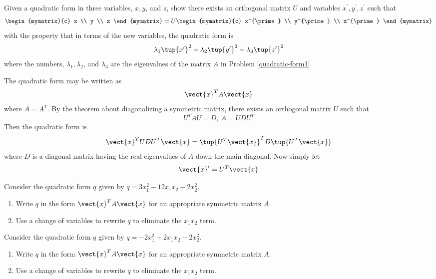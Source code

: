 \begin{enumialphparenastyle}
\begin{ex} Given a quadratic form in three variables, $x,y$, and $z$, show there
exists an orthogonal matrix $U$ and variables $x^{\prime },y^{\prime
},z^{\prime }$ such that 
\begin{equation*}
\begin{mymatrix}{c}
x \\ 
y \\ 
z
\end{mymatrix} =U\begin{mymatrix}{c}
x^{\prime } \\ 
y^{\prime } \\ 
z^{\prime }
\end{mymatrix}
\end{equation*}
with the property that in terms of the new variables, the quadratic form is 
\begin{equation*}
\lambda _{1}\tup{x^{\prime }} ^{2}+\lambda _{2}\tup{y^{\prime
}} ^{2}+\lambda _{3}\tup{z^{\prime }} ^{2}
\end{equation*}
where the numbers, $\lambda _{1},\lambda _{2}$, and $\lambda _{3}$ are the
eigenvalues of the matrix $A$ in Problem \ref{quadratic-form1}. 
\begin{sol}
The quadratic form
may be written as
\[
\vect{x}^{T}A\vect{x}
\]
where $A=A^{T}$. By the theorem about diagonalizing a symmetric matrix,
there exists an orthogonal matrix $U$ such that
\[
U^{T}AU=D,\ A=UDU^{T}
\]
Then the quadratic form is
\[
\vect{x}^{T}UDU^{T}\vect{x}=\tup{U^{T}\vect{x}} ^{T}D\tup{
U^{T}\vect{x}}
\]
where $D$ is a diagonal matrix having the real eigenvalues of $A$ down the
main diagonal. Now simply let
\[
\vect{x}^{\prime } =  U^{T}\vect{x}
\]
\end{sol}
\end{ex}

\begin{ex} Consider the quadratic form $q$ given by $q = 3x_1^2 -12x_1x_2 - 2x_2^2$.\begin{enumerate}
\item Write $q$ in the form $\vect{x}^TA\vect{x}$ for an appropriate symmetric matrix $A$.
\item Use a change of variables to rewrite $q$ to eliminate the $x_1x_2$ term. 
\end{enumerate}
\end{ex}

\begin{ex} Consider the quadratic form $q$ given by $q = -2x_1^2 + 2x_1x_2 - 2x_2^2$.
\begin{enumerate}
\item Write $q$ in the form $\vect{x}^TA\vect{x}$ for an appropriate symmetric matrix $A$.
\item Use a change of variables to rewrite $q$ to eliminate the $x_1x_2$ term. 
\end{enumerate}
\end{ex}


\end{enumialphparenastyle}

